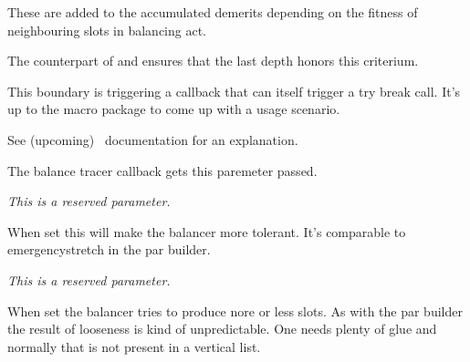 \stopoldprimitive

\startnewprimitive[title={\prm {balanceadjdemerits}}]

These are added to the accumulated demerits depending on the fitness of
neighbouring slots in balancing act.

\stopnewprimitive

\startnewprimitive[title={\prm {balancebottomskip}}]

The counterpart of  and ensures that the last depth honors
this criterium.

\stopnewprimitive

\startnewprimitive[title={\prm {balanceboundary}}]

This boundary is triggering a callback that can itself trigger a try break call. It's up to
the macro package to come up with a usage scenario.

\stopnewprimitive

\startnewprimitive[title={\prm {balancebreakpasses}}]

See (upcoming) \CONTEXT\ documentation for an explanation.

\stopnewprimitive

\startnewprimitive[title={\prm {balancechecks}}]

The balance tracer callback gets this paremeter passed.

\stopnewprimitive

\startnewprimitive[title={\prm {balanceemergencyshrink}}]

{\em This is a reserved parameter.}

\stopnewprimitive

\startnewprimitive[title={\prm {balanceemergencystretch}}]

When set this will make the balancer more tolerant. It's comparable to \prm
{emergencystretch} in the par builder.

\stopnewprimitive

\startnewprimitive[title={\prm {balancelineheight}}]

{\em This is a reserved parameter.}

\stopnewprimitive

\startnewprimitive[title={\prm {balancelooseness}}]

When set the balancer tries to produce nore or less slots. As with the par
builder the result of looseness is kind of unpredictable. One needs plenty of
glue and normally that is not present in a vertical list.

